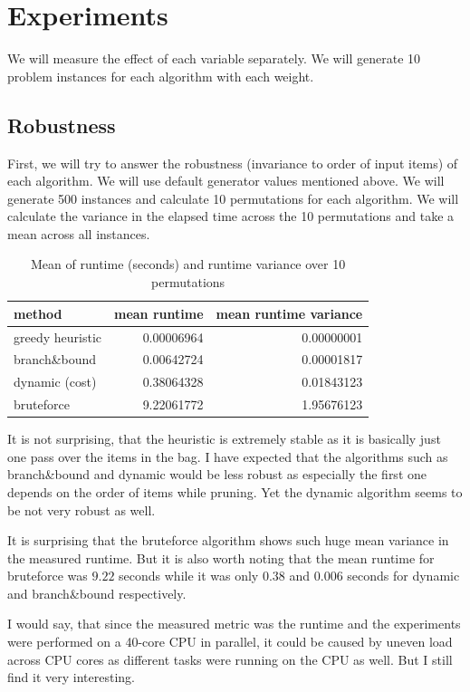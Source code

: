 \documentclass[a4paper,10pt]{article}
\begin{document}
\clearpage

\section{Experiments}
We will measure the effect of each variable separately. We will generate 10 problem instances for each algorithm with each weight.

\subsection{Robustness}
First, we will try to answer the robustness (invariance to order of input items) of each algorithm. We will use default generator values mentioned above. We will generate 500 instances and calculate 10 permutations for each algorithm. We will calculate the variance in the elapsed time across the 10 permutations and take a mean across all instances.

\begin{table}[!htb]
\centering
\begin{tabular}{lrr}
method & mean runtime & mean runtime variance\\
\midrule
greedy heuristic & 0.00006964 & 0.00000001 \\
branch\&bound & 0.00642724 & 0.00001817 \\
dynamic (cost) & 0.38064328 & 0.01843123 \\
bruteforce   & 9.22061772 & 1.95676123 \\
\bottomrule
\end{tabular}
\caption{Mean of runtime (seconds) and runtime variance over 10 permutations}
\end{table}

It is not surprising, that the heuristic is extremely stable as it is basically just one pass over the items in the bag. I have expected that the algorithms such as branch\&bound and dynamic would be less robust as especially the first one depends on the order of items while pruning. Yet the dynamic algorithm seems to be not very robust as well.

It is surprising that the bruteforce algorithm shows such huge mean variance in the measured runtime. But it is also worth noting that the mean runtime for bruteforce was $9.22$ seconds while it was only $0.38$ and $0.006$ seconds for dynamic and branch\&bound respectively.

I would say, that since the measured metric was the runtime and the experiments were performed on a 40-core CPU in parallel, it could be caused by uneven load across CPU cores as different tasks were running on the CPU as well. But I still find it very interesting.
\end{document}
